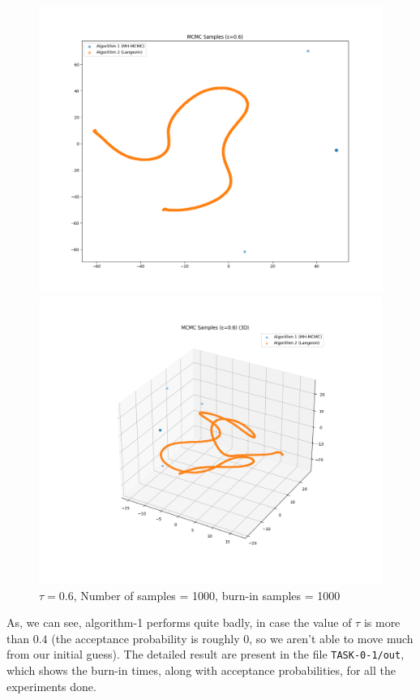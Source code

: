 \documentclass[a4paper,12pt]{article}
\begin{document}
\begin{figure}[H]
  \centering
  \begin{minipage}{0.48\textwidth}
    \includegraphics[width=\linewidth]{TASK-0-1/images/samples_eps0.6_n1000_burn500_tsne_2d.png}
  \end{minipage}
  \hfill
  \begin{minipage}{0.48\textwidth}
    \includegraphics[width=\linewidth]{TASK-0-1/images/samples_eps0.6_n1000_burn1000_tsne_3d.png}
  \end{minipage}
  \caption{$\tau = 0.6$, Number of samples = 1000, burn-in samples = 1000}
\end{figure}



As, we can see, algorithm-1 performs quite badly, in case the value of $\tau$ is more than $0.4$ (the acceptance probability is roughly 0, so we aren't able to move much from our initial guess). The detailed result are present in the file \texttt{TASK-0-1/out}, which shows the burn-in times, along with acceptance probabilities, for all the experiments done.
\end{document}
